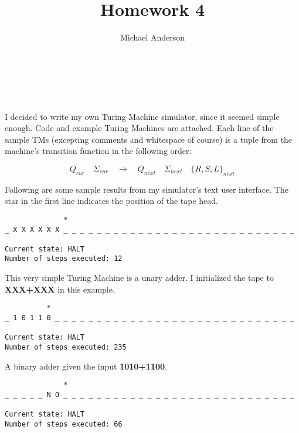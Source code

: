 \documentclass{article}
\author{Michael Anderson}
\title{Homework 4}
\begin{document}
\maketitle
{}
\\
\flushleft
\newpage

\section{}
I decided to write my own Turing Machine simulator, since it seemed simple
enough. Code and example Turing Machines are attached. Each line of the
sample TMs (excepting comments and whitespace of course) is a
tuple from the machine's transition function in the following order:

\[
Q_{cur} \quad \Sigma_{cur} \quad \rightarrow \quad Q_{next} \quad \Sigma_{next}
\quad \{R,S,L\}_{next}
\]

Following are some sample results from my simulator's text user interface. The
star in the first line
indicates the position of the tape head.

\vspace{2em}

\begin{verbatim}
              *
_ X X X X X X _ _ _ _ _ _ _ _ _ _ _ _ _ _ _ _ _ _ _ _ _ _ _ _ _ _ _ _

Current state: HALT
Number of steps executed: 12
\end{verbatim}

This very simple Turing Machine is a unary adder. I initialized the tape
to \textbf{XXX+XXX} in this example.

\vspace{3em}

\begin{verbatim}
          *
_ 1 0 1 1 0 _ _ _ _ _ _ _ _ _ _ _ _ _ _ _ _ _ _ _ _ _ _ _ _ _ _ _ _ _

Current state: HALT
Number of steps executed: 235
\end{verbatim}

A binary adder given the input \textbf{1010+1100}.

\vspace{3em}

\begin{verbatim}
              *
_ _ _ _ _ N O _ _ _ _ _ _ _ _ _ _ _ _ _ _ _ _ _ _ _ _ _ _ _ _ _ _ _ _

Current state: HALT
Number of steps executed: 66
\end{verbatim}
\end{document}
